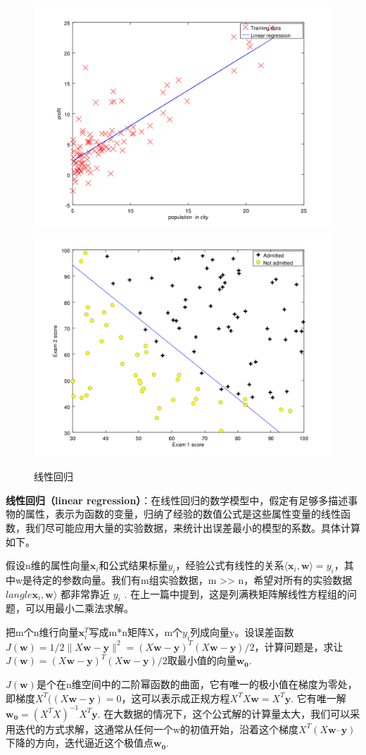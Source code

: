 \begin{figure}[t]
	\centering
	\includegraphics[width=0.49\linewidth]{pic/161238petg2epyqhslbulz.png}
	\includegraphics[width=0.49\linewidth]{pic/161239i3870x2cvwmclc09.png}
	\caption{线性回归}
	\label{fig:161238petg2epyqhslbulz}
\end{figure}

\textbf{线性回归（linear regression）}：在线性回归的数学模型中，假定有足够多描述事物的属性，表示为函数的变量，归纳了经验的数值公式是这些属性变量的线性函数，我们尽可能应用大量的实验数据，来统计出误差最小的模型的系数。具体计算如下。

假设n维的属性向量$ \mathbf{x}_{i} $和公式结果标量$ y_{i} $，经验公式有线性的关系$ \langle \mathbf{x}_i, \mathbf{w}\rangle = y_{i}$，其中w是待定的参数向量。我们有m组实验数据，m >> n，希望对所有的实验数据 $langle \mathbf{x}_i, \mathbf{w}\rangle$ 都非常靠近 $  y_i $ . 在上一篇中提到，这是列满秩矩阵解线性方程组的问题，可以用最小二乘法求解。

把m个n维行向量$ \mathbf{x}_i^T $写成m*n矩阵X，m个$ y_i $列成向量y。设误差函数$ J(\mathbf{w}) =1/2\|X\mathbf{w} - \mathbf{y}\|^2 = (X\mathbf{w} - \mathbf{y})^T (X\mathbf{w} - \mathbf{y})/2 $，计算问题是，求让$ J(\mathbf{w}) = (X\mathbf{w} - \mathbf{y})^T (X\mathbf{w} - \mathbf{y})/2 $取最小值的向量$ \mathbf{w_0} $.  

$ J(\mathbf{w})  $是个在n维空间中的二阶幂函数的曲面，它有唯一的极小值在梯度为零处，即梯度$ X^T ((X\mathbf{w} - \mathbf{y}) = 0 $，这可以表示成正规方程$ X^TX\mathbf{w} =X^T\mathbf{y} $. 它有唯一解$ \mathbf{w_0} =(X^TX)^{-1}X^T\mathbf{y} $.  在大数据的情况下，这个公式解的计算量太大，我们可以采用迭代的方式求解，这通常从任何一个w的初值开始，沿着这个梯度$ X^T ( X\mathbf{w} – \mathbf{y}) $下降的方向，迭代逼近这个极值点$ \mathbf{w_0} $.


